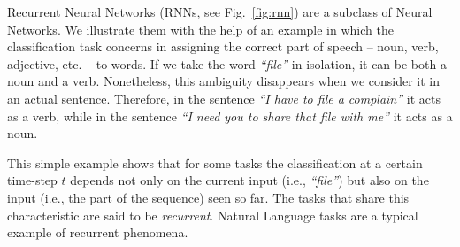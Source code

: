Recurrent Neural Networks (RNNs, see Fig.~\ref{fig:rnn}) are a subclass of Neural Networks. We
illustrate them with the help of an example in which the
classification task concerns in assigning the correct part of speech -- noun, verb, adjective, etc. --
to words.  If we take the word \emph{``file''} in isolation,
it can be both a noun and a verb. Nonetheless, this ambiguity
disappears when we consider it in an actual sentence. Therefore, in the
sentence \emph{``I have to file a complain''} it acts as a verb, while
in the sentence \emph{``I need you to share that file with me''} it
acts as a noun.

This simple example shows that for some tasks the classification at a
certain time-step $t$ depends not only on the current input (i.e.,
\emph{``file''}) but also on the input (i.e., the part of the
sequence) seen so far. The tasks that share this characteristic are
said to be \emph{recurrent}. Natural Language tasks are a typical
example of recurrent phenomena.

